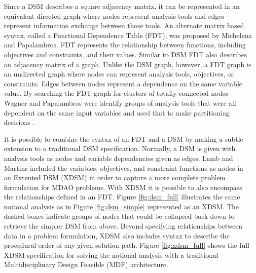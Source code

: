 
    Since a DSM describes a square adjacency matrix, it can be represented in an equivalent directed graph where nodes represent analysis tools and
    edges represent information exchange between those tools. An alternate matrix based syntax, called a
    Functional Dependence Table (FDT), was proposed by Michelena and Papalambros.
    FDT represents the relationship between functions, including objectives and constraints, and their values\cite{Michelena1997}. Similar to DSM
    FDT also describes an adjacency matrix of a graph. Unlike the DSM graph, however, a FDT graph is an undirected
    graph where nodes can represent analysis tools, objectives, or constraints. Edges between nodes represent a dependence on the same
    variable value. By searching the FDT graph for clusters of totally connected nodes Wagner and Papalambros were identify groups of
    analysis tools that were all dependent on the same input variables and used that to make partitioning decisions \cite{Wagner1993}.

    It is possible to combine the syntax of an FDT and a DSM by making a subtle extension to a traditional DSM specification. Normally, a DSM is given
    with analysis tools as nodes and variable dependencies given as edges. Lamb and Martins included the variables, objectives, and constraint functions
    as nodes in an Extented DSM (XDSM)\cite{Lambe2012} in order to capture a more complete problem formulation for MDAO problems. With XDSM
    it is possible to also encompass the relationships defined in an FDT. Figure \ref{fig:dsm_full}
    illustrates the same notional analysis as in Figure \ref{fig:dsm_simple} represented as an XDSM.
    The dashed boxes indicate groups of nodes that could be collapsed back down to retrieve the simpler
    DSM from above. Beyond specifying relationships between data in a problem formulation, XDSM also includes syntax to describe the
    procedural order of any given solution path. Figure \ref{fig:xdsm_full} shows the full XDSM specification for solving the notional
    analysis with a traditional Multidisciplinary Design Feasible (MDF) architecture.

